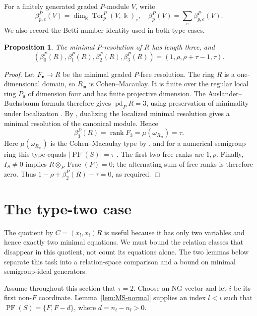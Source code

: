 \documentclass[10pt]{amsart}
\theoremstyle{plain}
\newtheorem{proposition}[lemma]{Proposition}
\begin{document}
For a finitely generated graded \(P\)-module \(V\), write
\[
\beta_{p,e}^P(V)
=\dim_{\Bbbk}\operatorname{Tor}_p^P(V,\Bbbk)_e,
\quad
\beta_p^P(V)=\sum_e\beta_{p,e}^P(V).
\]
We also record the Betti-number identity used in both type cases.

\begin{proposition}\label{prop:betti-identities}
The minimal \(P\)-resolution of \(R\) has length three, and
\[
(\beta_0^P(R),\beta_1^P(R),\beta_2^P(R),\beta_3^P(R))
=(1,\rho,\rho+\tau-1,\tau).
\]
\end{proposition}

\begin{proof}
Let \(F_\bullet\to R\) be the minimal graded \(P\)-free resolution.
The ring \(R\) is a one-dimensional domain, so \(R_{\mathfrak m}\) is
Cohen--Macaulay.  It is finite over the regular local ring
\(P_{\mathfrak n}\) of dimension four and has finite projective dimension.
The Auslander--Buchsbaum formula therefore gives
\(\operatorname{pd}_P R=3\), using preservation of minimality under
localization \cite[Theorem~19.9]{Eis95}.
By \cite[Corollary~21.16]{Eis95}, dualizing the localized minimal
resolution gives a minimal resolution of the canonical module.  Hence
\[
\beta_3^P(R)=\operatorname{rank}F_3
=\mu(\omega_{R_{\mathfrak m}})=\tau.
\]
Here \(\mu(\omega_{R_{\mathfrak m}})\) is the Cohen--Macaulay type by
\cite[Exercise~21.14(a)]{Eis95}, and for a numerical semigroup ring this
type equals \(|\operatorname{PF}(S)|=\tau\) \cite[\S1]{MS21}.
The first two free ranks are \(1,\rho\).  Finally, \(I_S\ne0\) implies
\(R\otimes_P\operatorname{Frac}(P)=0\); the alternating sum of free
ranks is therefore zero.  Thus
\(1-\rho+\beta_2^P(R)-\tau=0\), as required.
\end{proof}

\section{The type-two case}\label{sec:type2}

The quotient by \(C=(x_l,x_i)R\) is useful because it has only two
variables and hence exactly two minimal equations.  We must bound the
relation classes that disappear in this quotient, not count its equations
alone.  The two lemmas below separate this task into a relation-space
comparison and a bound on minimal semigroup-ideal generators.

Assume throughout this section that \(\tau=2\).  Choose an NG-vector and
let \(i\) be its first non-\(F\) coordinate.  Lemma~\ref{lem:MS-normal}
supplies an index \(l<i\) such that
\(\operatorname{PF}(S)=\{F,F-d\}\), where \(d=n_i-n_l>0\).
\end{document}
